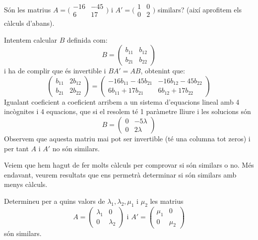 \begin{exemple}
    Són les matrius $A=\big(\begin{smallmatrix}  -16 & -45 \\ 6 & 17\end{smallmatrix}\big)$ i $A'=\big(\begin{smallmatrix} 1 & 0 \\ 0 & 2  \end{smallmatrix}\big)$ similars? (així aprofitem els càlculs d'abans).
    
    Intentem calcular $B$ definida com:
    $$
    B=\begin{pmatrix} b_{11} & b_{12} \\ b_{21} & b_{22} \end{pmatrix}
    $$
    i ha de complir que és invertible i $BA'=AB$, obtenint que:
    $$
    \begin{pmatrix}
    b_{11} & 2b_{12} \\ b_{21} & 2b_{22}
    \end{pmatrix}
    =
    \begin{pmatrix}
    -16b_{11}-45b_{21} & -16b_{12}-45b_{22}\\ 6b_{11}+17b_{21} & 6b_{12}+17b_{22}
    \end{pmatrix}
    $$
    Igualant coeficient a coeficient arribem a un sistema d'equacions lineal amb 4 incògnites i 4 equacions, que si el resolem té 1 paràmetre lliure i les solucions són
    $$
    B=\begin{pmatrix}
    0 & -5\lambda \\  0 & 2\lambda 
    \end{pmatrix}
    $$
    Observem que aquesta matriu mai pot ser invertible (té una columna tot zeros) i per tant $A$ i $A'$ no són similars.
\end{exemple}
Veiem que hem hagut de fer molts càlculs per comprovar si són similars o no. Més endavant, veurem resultats que ens permetrà determinar si són similars amb menys càlculs.
\begin{exercici}
    Determineu per a quins valors de $\lambda_1, \lambda_2, \mu_1$ i $\mu_2$ les matrius 
    $$
    A=\begin{pmatrix}
    \lambda_1 & 0 \\ 0 & \lambda_2
    \end{pmatrix}
    \text{ i }
    A'=\begin{pmatrix}
    \mu_1 & 0 \\ 0 & \mu_2
    \end{pmatrix}
    $$
    són similars.
\end{exercici}

